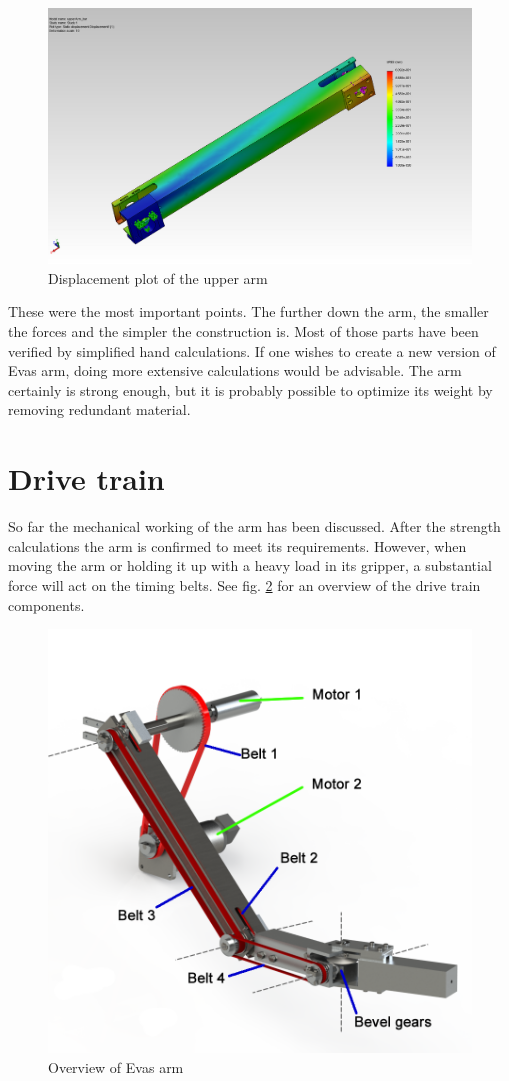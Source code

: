 \documentclass[technical_document.tex]{subfiles}
\begin{document}
\begin{figure}[ht!]
	\centering
	\mbox{\includegraphics[scale=0.3]{Images/upperArm_bar_displace.jpg}}
	\caption{Displacement plot of the upper arm}
	\label{fig:upperArm_displace}
\end{figure}

These were the most important points. The further down the arm, the smaller the forces and the simpler the construction is. Most of those parts have been verified by simplified hand calculations. If one wishes to create a new version of Eva\textquotesingle{}s arm, doing more extensive calculations would be advisable. The arm certainly is strong enough, but it is probably possible to optimize its weight by removing redundant material.


\section{Drive train}

So far the mechanical working of the arm has been discussed. After the strength calculations the arm is confirmed to meet its requirements. However, when moving the arm or holding it up with a heavy load in its gripper, a substantial force will act on the timing belts. See fig. \ref{fig:overviewLegenda} for an overview of the drive train components.


\begin{figure}[ht!]
	\centering
	\mbox{\includegraphics[scale=1.0]{Images/overview_legenda.png}}
	\caption{Overview of Eva\textquotesingle{}s arm}
	\label{fig:overviewLegenda}
\end{figure}
 
\end{document}
